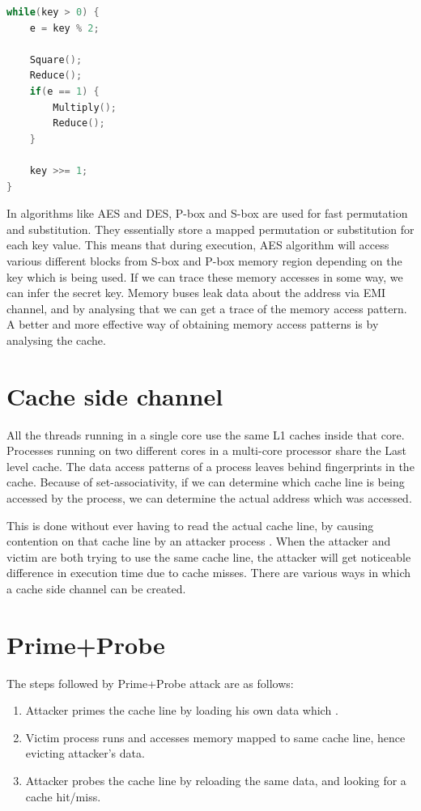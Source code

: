 \begin{lstlisting}[caption={Key-dependent branch of fast
exponentiation used in RSA},label={lst:kdrsa},language={C}]
while(key > 0) {
    e = key % 2;

    Square();
    Reduce();
    if(e == 1) {
        Multiply();
        Reduce();
    }

    key >>= 1;
}
\end{lstlisting}

In algorithms like AES and DES, P-box and S-box are used for fast permutation
and substitution. They essentially store a mapped permutation or substitution
for each key value. This means that during execution, AES algorithm will
access various different blocks from S-box and P-box memory region depending
on the key which is being used. If we can trace these memory accesses in some
way, we can infer the secret key. Memory buses leak data about the address via
EMI channel, and by analysing that we can get a trace of the memory access
pattern. A better and more effective way of obtaining memory access patterns
is by analysing the cache.

\section{Cache side channel}

All the threads running in a single core use the same L1 caches inside that
core. Processes running on two different cores in a multi-core processor share
the Last level cache. The data access patterns of a process leaves behind
fingerprints in the cache. Because of set-associativity, if we can determine
which cache line is being accessed by the process, we can determine the actual
address which was accessed.

This is done without ever having to read the actual cache line, by causing
contention on that cache line by an attacker process
. When the attacker and victim are both trying to
use the same cache line, the attacker will get noticeable difference in
execution time due to cache misses. There are various ways in which a cache
side channel can be created.

\section{Prime+Probe}

The steps followed by Prime+Probe attack are as follows:

\begin{enumerate}
\item Attacker primes the cache line by loading his own data which .
\item Victim process runs and accesses memory mapped to same cache line, hence
    evicting attacker's data.
\item Attacker probes the cache line by reloading the same data, and looking
    for a cache hit/miss.
\end{enumerate}

